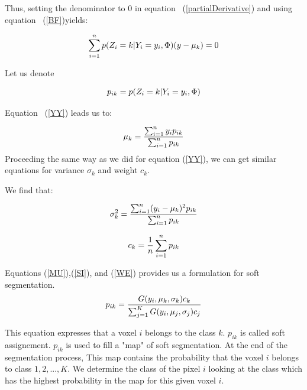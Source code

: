 Thus, setting the denominator to 0 in equation ~(\ref{partialDerivative}) and using equation ~(\ref{BF})yields:
 
  \begin{equation}\label{YY}
  \sum_{i=1}^n p(Z_i=k|Y_i=y_i,\Phi)(y-\mu_k)=0\\
  \end{equation}

Let us denote

  \begin{equation}%
  p_{ik}=p(Z_i=k|Y_i=y_i,\Phi)\\
  \end{equation}

Equation ~(\ref{YY}) leads us to:
 
  \begin{equation}\label{MU}
  \mu_k = \frac{\sum_{i=1}^n y_ip_{ik}}{\sum_{i=1}^n p_{ik}}\\
  \end{equation}
Proceeding the same way as we did for equation (\ref{YY}), we can get similar equations for variance $\sigma_k$ and weight $c_k$. 

We find that:

  \begin{equation}\label{SI}
  \sigma_k^2 = \frac{\sum_{i=1}^n (y_i-\mu_k)^2p_{ik}}{\sum_{i=1}^n p_{ik}}\\
  \end{equation}
  
  \begin{equation}\label{WE}
  c_k = \frac{1}{n}\sum_{i=1}^n p_{ik}\\
  \end{equation}

\par
Equations (\ref{MU}),(\ref{SI}), and (\ref{WE}) provides us a formulation for soft segmentation. 
  \begin{equation}\label{SS}
  p_{ik}= \frac{G(y_i,\mu_k,\sigma_k)c_k}{\sum_{j=1}^K G(y_i,\mu_j,\sigma_j)c_j}\\
  \end{equation}


This equation expresses that a voxel $i$ belongs to the class $k$. $p_{ik}$ is called soft assignement.
$p_{ik}$ is used to fill a "map" of soft segmentation. At the end of the segmentation process, This map contains the probability that the voxel $i$ belongs to class $1, 2, ..., K$. We determine the class of the pixel $i$ looking at the class which has the highest probability in the map for this given voxel $i$.
  
